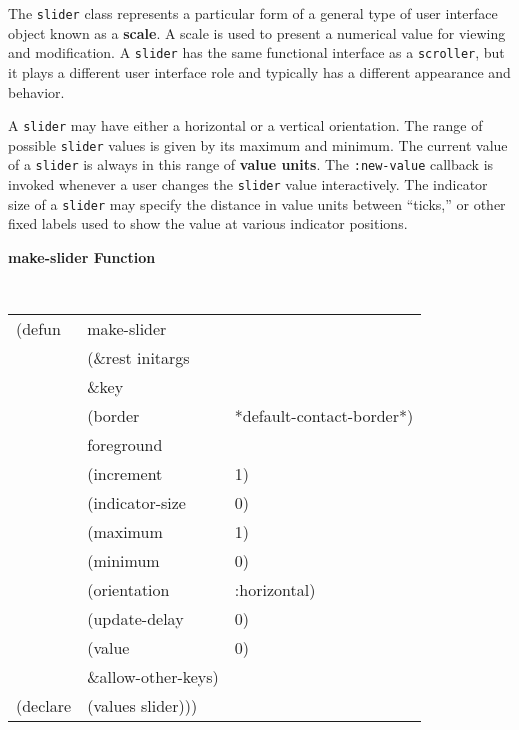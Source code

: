 \vfill\pagebreak



The {\tt slider} class represents a particular form of a general type of user
interface object known as a {\bf scale}.  A scale is used to
present a numerical value for viewing and modification.  A {\tt slider} has the
same functional interface as a {\tt scroller}, but it plays
a different  user interface role and typically has a different appearance and
behavior.

A {\tt slider} may have either a horizontal or a vertical orientation.  The
range of possible {\tt slider} values is given by its maximum and minimum.  The
current value of a {\tt slider} is always in this range of {\bf value
units}.  The {\tt :new-value} callback is invoked
whenever a user changes the {\tt slider} value interactively.  The indicator
size of a {\tt slider} may specify the distance in value units between
``ticks,'' or other fixed labels used to show the value at various indicator
positions.



{\samepage
{\large {\bf make-slider \hfill Function}} 
\begin{flushright} \parbox[t]{6.125in}{
\tt
\begin{tabular}{lll}
\raggedright
(defun & make-slider \\
       & (\&rest initargs \\
       & \&key  \\
       & (border                & *default-contact-border*) \\ 
       & foreground \\
       & (increment             & 1) \\ 
       & (indicator-size        & 0) \\ 
       & (maximum               & 1) \\ 
       & (minimum               & 0) \\ 
       & (orientation           & :horizontal) \\ 
       & (update-delay          & 0) \\
       & (value                 & 0) \\  
       &   \&allow-other-keys) \\
(declare & (values   slider)))
\end{tabular}
\rm

}\end{flushright}}

